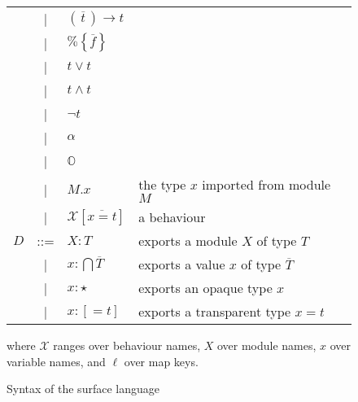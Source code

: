 \documentclass[a4paper,10pt]{article}
\begin{document}
\begin{figure}
\begin{tabular}{r c ll}
    & | & $(\overline{\,t\,})\rightarrow t$\\
    & | & $\texttt{\%}\!\left\{\overline{f}\right\}$ \\
    & | & $t\vee t$ \\
    & | & $t\wedge t$ \\
    & | & $\neg t$\\
    & | & $\alpha$ \\
    & | & $\mathbb{O}$ \\
    & | & {\color{red}$M.x$}                          &\color{gray} the type $x$ imported from module $M$\\
    & | & {\color{red}$\mathcal{X}[\overline{x=t}]$}  &\color{gray} a behaviour\\[3mm]
    $D$ & ::= & $X : T$                               &\color{gray} exports a module $X$ of type $T$\\
    & | & $x : \bigcap \overline{T}$                  &\color{gray} exports a value $x$ of type $\overline T$ \\
    & | & $x : \star$                                 &\color{gray} exports an opaque type $x$\\  
    & | & $x : [=t]$                                  &\color{gray} exports a transparent type $x = t$  \\[3mm]
  \end{tabular}

 where $\mathcal X$ ranges over behaviour names, $X$ over module names, $x$ over variable names, and $\ell$ over map keys. 
  \caption{Syntax of the surface language}
\end{figure}
\end{document}
